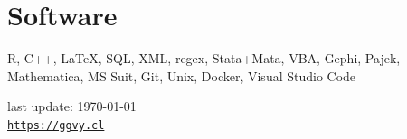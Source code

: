 \documentclass[letterpaper, 10pt]{article}
\def\footerlink{https://ggvy.cl}
\begin{document}
\section*{Software}

R, C++, \LaTeX, SQL, XML, regex, Stata+Mata, VBA, Gephi, Pajek, Mathematica, MS Suit, Git, Unix, Docker, Visual Studio Code

\bigskip

\begin{center}
 \begin{footnotesize}
   last update: \today \\
   \href{\footerlink}{\texttt{\footerlink}}
 \end{footnotesize}
\end{center}
\end{document}
